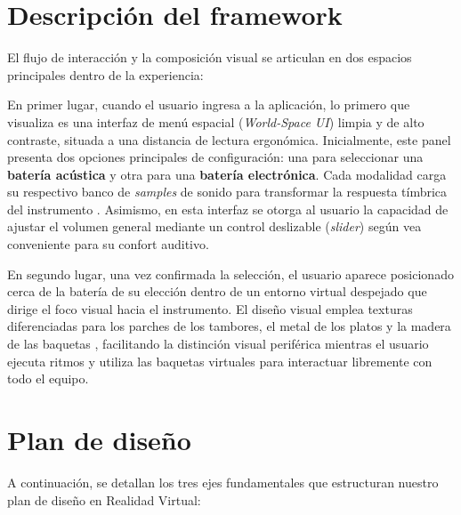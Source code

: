 \documentclass{article}
\begin{document}
\section{Descripción del framework}

El flujo de interacción y la composición visual se articulan en dos espacios principales dentro de la experiencia:

En primer lugar, cuando el usuario ingresa a la aplicación, lo primero que visualiza es una interfaz de menú espacial (\textit{World-Space UI}) limpia y de alto contraste, situada a una distancia de lectura ergonómica. Inicialmente, este panel presenta dos opciones principales de configuración: una para seleccionar una \textbf{batería acústica} y otra para una \textbf{batería electrónica}. Cada modalidad carga su respectivo banco de \textit{samples} de sonido para transformar la respuesta tímbrica del instrumento \cite{samples}. Asimismo, en esta interfaz se otorga al usuario la capacidad de ajustar el volumen general mediante un control deslizable (\textit{slider}) según vea conveniente para su confort auditivo.

En segundo lugar, una vez confirmada la selección, el usuario aparece posicionado cerca de la batería de su elección dentro de un entorno virtual despejado que dirige el foco visual hacia el instrumento. El diseño visual emplea texturas diferenciadas para los parches de los tambores, el metal de los platos y la madera de las baquetas \cite{batery_asset}, facilitando la distinción visual periférica mientras el usuario ejecuta ritmos y utiliza las baquetas virtuales para interactuar libremente con todo el equipo.

\section{Plan de diseño}

A continuación, se detallan los tres ejes fundamentales que estructuran nuestro plan de diseño en Realidad Virtual:
\end{document}
